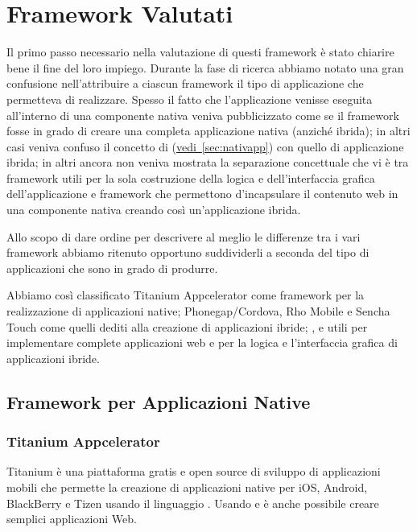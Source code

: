 \chapter{Framework Valutati}
	Il primo passo necessario nella valutazione di questi framework è stato 
	chiarire bene il fine del loro impiego. Durante la fase di ricerca abbiamo 
	notato una gran confusione nell'attribuire a ciascun framework il tipo di
	applicazione che permetteva di realizzare. Spesso il fatto che 
	l'applicazione venisse eseguita all'interno di una componente nativa veniva 
	pubblicizzato come se il framework fosse in grado di creare una completa 
	applicazione nativa (anziché ibrida); in altri casi 
	veniva confuso il concetto di \crosscomp 
	(\hyperref[sec:nativapp]{vedi~\ref{sec:nativapp}}) con quello di 
	applicazione ibrida; in altri ancora non veniva mostrata la separazione 
	concettuale che vi è tra framework utili per la sola costruzione della 
	logica e dell'interfaccia grafica dell'applicazione e framework che 
	permettono d'incapsulare il contenuto web in una componente nativa creando 
	così un'applicazione ibrida.
	
	Allo scopo di dare ordine per descrivere al meglio le differenze tra i vari 
	framework abbiamo ritenuto opportuno suddividerli a seconda del tipo di 
	applicazioni che sono in grado di produrre.
	
	Abbiamo così classificato Titanium Appcelerator come framework per la 
	realizzazione di applicazioni native; Phonegap/Cordova, Rho Mobile e Sencha 
	Touch come quelli dediti alla creazione di applicazioni ibride; \jqm{},
	\kendomob{} e \phonejs{} utili per implementare complete 
	applicazioni web e per la logica e l'interfaccia grafica di applicazioni 
	ibride.

	\section{Framework per Applicazioni Native}
		
		\subsection{Titanium Appcelerator}
		\label{sec:titanium}
			Titanium è una piattaforma gratis e open source di sviluppo di 
			applicazioni mobili che permette la creazione di applicazioni native
			\crossplat{} per iOS, Android, BlackBerry e Tizen usando il 
			linguaggio \js{}. Usando \js{} e \html{} è anche possibile
			creare semplici applicazioni Web.
			
